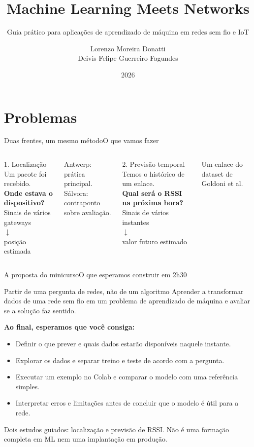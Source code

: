 \documentclass[aspectratio=169,10pt]{beamer}
\title[ML Meets Networks]{Machine Learning Meets Networks}
\subtitle{Guia prático para aplicações de aprendizado de máquina em redes sem fio e IoT}
\author[Donatti \& Fagundes]{Lorenzo Moreira Donatti\\Deivis Felipe Guerreiro Fagundes}
\institute[ERRC 2026]{Escola Regional de Redes de Computadores}
\date{2026}
\begin{document}
\begin{frame}[plain]
\titlepage
\end{frame}

\section{Problemas}
\begin{frame}{Duas frentes, um mesmo método}{O que vamos fazer}
\begin{columns}[T]
\begin{block}{1. Localização}
Um pacote foi recebido.\\[2mm]
\textbf{Onde estava o dispositivo?}\\[2mm]
Sinais de vários gateways\\
$\downarrow$\\
posição estimada
\end{block}
Antwerp: prática principal.\\
Sálvora: contraponto sobre avaliação.
\begin{block}{2. Previsão temporal}
Temos o histórico de um enlace.\\[2mm]
\textbf{Qual será o RSSI na próxima hora?}\\[2mm]
Sinais de vários instantes\\
$\downarrow$\\
valor futuro estimado
\end{block}
Um enlace do dataset de Goldoni et al.
\end{columns}
\end{frame}

\begin{frame}{A proposta do minicurso}{O que esperamos construir em 2h30}
\begin{block}{Partir de uma pergunta de redes, não de um algoritmo}
Aprender a transformar dados de uma rede sem fio em um problema de aprendizado
de máquina e avaliar se a solução faz sentido.
\end{block}
\textbf{Ao final, esperamos que você consiga:}
\begin{itemize}
\item Definir o que prever e quais dados estarão disponíveis naquele instante.
\item Explorar os dados e separar treino e teste de acordo com a pergunta.
\item Executar um exemplo no Colab e comparar o modelo com uma referência simples.
\item Interpretar erros e limitações antes de concluir que o modelo é útil para a rede.
\end{itemize}
\vspace{2mm}
\small Dois estudos guiados: localização e previsão de RSSI.
Não é uma formação completa em ML nem uma implantação em produção.
\end{frame}
\end{document}
